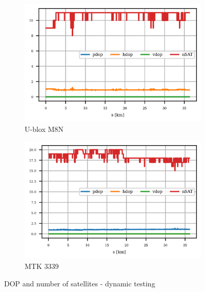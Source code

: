 \documentclass{article}
\begin{document}
			\begin{figure}[h]
		   		\centering
		     	\begin{subfigure}[b]{0.45\textwidth}
		      		\centering
		      	   \includegraphics[width=\textwidth]{Dynamic/cond_dop_MTK 3339.png}
		      	   \caption{U-blox M8N}
		      	   \label{fig:dyn_dop_gadget1}
		     	\end{subfigure}
		     	\begin{subfigure}[b]{0.45\textwidth}
		      	   \centering
		      	   \includegraphics[width=\textwidth]{Dynamic/cond_dop_U-blox M8N.png}
		      	   \caption{MTK 3339}
		      	   \label{fig:dyn_dop_gadget2}
		     	\end{subfigure}
		      \caption{DOP and number of satellites - dynamic testing}
		      \label{fig:dyn_dop_gadgets}
			\end{figure}
\end{document}
